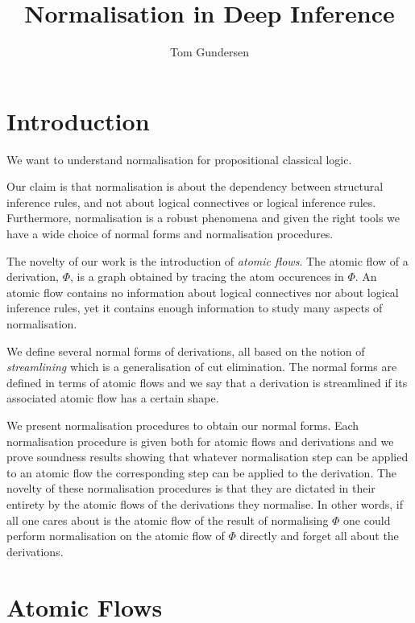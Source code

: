 \documentclass[12pt]{article}
\begin{document}
\title{Normalisation in Deep Inference}
\author{Tom Gundersen}

\maketitle

\section{Introduction}

We want to understand normalisation for propositional classical logic.

Our claim is that normalisation is about the dependency between structural inference rules, and not about logical connectives or logical inference rules. Furthermore, normalisation is a robust phenomena and given the right tools we have a wide choice of normal forms and normalisation procedures.

The novelty of our work is the introduction of \emph{atomic flows}. The atomic flow of a derivation, $\Phi$, is a graph obtained by tracing the atom occurences in $\Phi$. An atomic flow contains no information about logical connectives nor about logical inference rules, yet it contains enough information to study many aspects of normalisation.

We define several normal forms of derivations, all based on the notion of \emph{streamlining} which is a generalisation of cut elimination. The normal forms are defined in terms of atomic flows and we say that a derivation is streamlined if its associated atomic flow has a certain shape.

We present normalisation procedures to obtain our normal forms. Each normalisation procedure is given both for atomic flows and derivations and we prove soundness results showing that whatever normalisation step can be applied to an atomic flow the corresponding step can be applied to the derivation. The novelty of these normalisation procedures is that they are dictated in their entirety by the atomic flows of the derivations they normalise. In other words, if all one cares about is the atomic flow of the result of normalising $\Phi$ one could perform normalisation on the atomic flow of $\Phi$ directly and forget all about the derivations.

\section{Atomic Flows}
\end{document}
